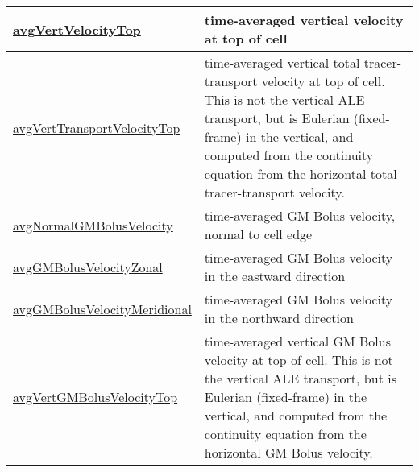 {\begin{center}
\begin{longtable}{| p{2.0in} | p{4.0in} |}
	\hline
	\hyperref[subsec:var_sec_average_avgVertVelocityTop]{avgVertVelocityTop} & time-averaged vertical velocity at top of cell \\
	\hline
	\hyperref[subsec:var_sec_average_avgVertTransportVelocityTop]{avgVertTransportVelocityTop} & time-averaged vertical total tracer-transport velocity at top of cell.  This is not the vertical ALE transport, but is Eulerian (fixed-frame) in the vertical, and computed from the continuity equation from the horizontal total tracer-transport velocity. \\
	\hline
	\hyperref[subsec:var_sec_average_avgNormalGMBolusVelocity]{avgNormalGMBolusVelocity} & time-averaged GM Bolus velocity, normal to cell edge \\
	\hline
	\hyperref[subsec:var_sec_average_avgGMBolusVelocityZonal]{avgGMBolusVelocityZonal} & time-averaged GM Bolus velocity in the eastward direction \\
	\hline
	\hyperref[subsec:var_sec_average_avgGMBolusVelocityMeridional]{avgGMBolusVelocityMeridional} & time-averaged GM Bolus velocity in the northward direction \\
	\hline
	\hyperref[subsec:var_sec_average_avgVertGMBolusVelocityTop]{avgVertGMBolusVelocityTop} & time-averaged vertical GM Bolus velocity at top of cell.  This is not the vertical ALE transport, but is Eulerian (fixed-frame) in the vertical, and computed from the continuity equation from the horizontal GM Bolus velocity. \\
	\hline
\end{longtable}
\end{center}
}
